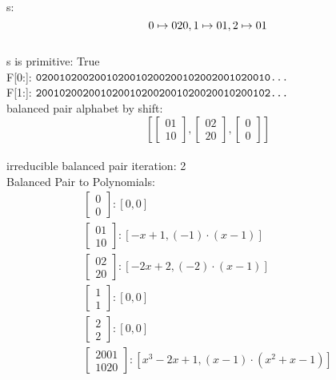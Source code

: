 
s: $$0 \mapsto 020\\, 1 \mapsto 01\\, 2 \mapsto 01\\$$ \\
s is primitive: True  \\
F[0:]: $ \text{\texttt{0200102002001020010200200102002001020010...}}  $ \\
F[1:]: $ \text{\texttt{2001020020010200102002001020020010200102...}}  $ \\
balanced pair alphabet by shift: $$ \left[\begin{bmatrix}01\\ 10\end{bmatrix}, \begin{bmatrix}02\\ 20\end{bmatrix}, \begin{bmatrix}0\\ 0\end{bmatrix}\right] $$ \\
irreducible balanced pair iteration: 2  \\ 
Balanced Pair to Polynomials: $$   \begin{array}{l} \begin{bmatrix}0\\ 0\end{bmatrix} : \left[0, 0\right]\\ \begin{bmatrix}01\\ 10\end{bmatrix} : \left[-x + 1, \left(-1\right) \cdot (x - 1)\right]\\ \begin{bmatrix}02\\ 20\end{bmatrix} : \left[-2 x + 2, \left(-2\right) \cdot (x - 1)\right]\\ \begin{bmatrix}1\\ 1\end{bmatrix} : \left[0, 0\right]\\ \begin{bmatrix}2\\ 2\end{bmatrix} : \left[0, 0\right]\\ \begin{bmatrix}2001\\ 1020\end{bmatrix} : \left[x^{3} - 2 x + 1, (x - 1) \cdot (x^{2} + x - 1)\right] \end{array} $$ \\
